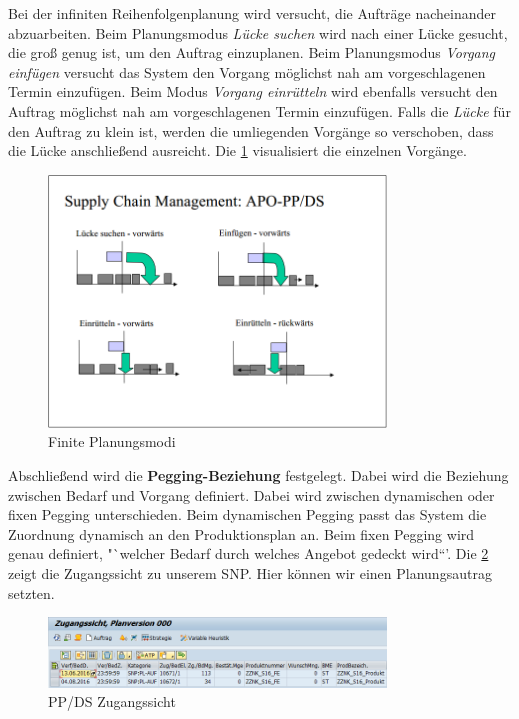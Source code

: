 Bei der infiniten Reihenfolgenplanung wird versucht, die Aufträge nacheinander abzuarbeiten. Beim Planungsmodus \textit{Lücke suchen} wird nach einer Lücke gesucht, die groß genug ist, um den Auftrag einzuplanen. Beim Planungsmodus \textit{Vorgang einfügen} versucht das System den Vorgang möglichst nah am vorgeschlagenen Termin einzufügen. Beim Modus \textit{Vorgang einrütteln} wird ebenfalls versucht den Auftrag möglichst nah am vorgeschlagenen Termin einzufügen. Falls die \textit{Lücke} für den Auftrag zu klein ist, werden die umliegenden Vorgänge so verschoben, dass die Lücke anschließend ausreicht. Die \ref{fig:planungsmodi} visualisiert die einzelnen Vorgänge.

\begin{figure}[h]
	\centering
	\includegraphics[width=0.8\textwidth]{../pics/scm_script_planungsmodi_finit_nko}
	\caption{Finite Planungsmodi \cite[Abschnitt 4.3.4, Seite 12]{scm:script_17_1}}
	\label{fig:planungsmodi}
\end{figure}

Abschließend wird die \textbf{Pegging-Beziehung} festgelegt. Dabei wird die Beziehung zwischen Bedarf und Vorgang definiert. Dabei wird zwischen dynamischen oder fixen Pegging unterschieden. Beim dynamischen Pegging passt das System die Zuordnung dynamisch an den Produktionsplan an. Beim fixen Pegging wird genau definiert, "`welcher Bedarf durch welches Angebot gedeckt wird“'. \cite[Abschnitt 4.3.4, Seite 12]{scm:script_17_1}
Die \ref{fig:planversion} zeigt die Zugangssicht zu unserem \ac{SNP}. Hier können wir einen Planungsautrag setzten.

\begin{figure}[h]
	\centering
	\includegraphics[width=0.8\textwidth]{../pics/PPDS_zugangssicht_nko}
	\caption{PP/DS Zugangssicht}
	\label{fig:planversion}
\end{figure}

